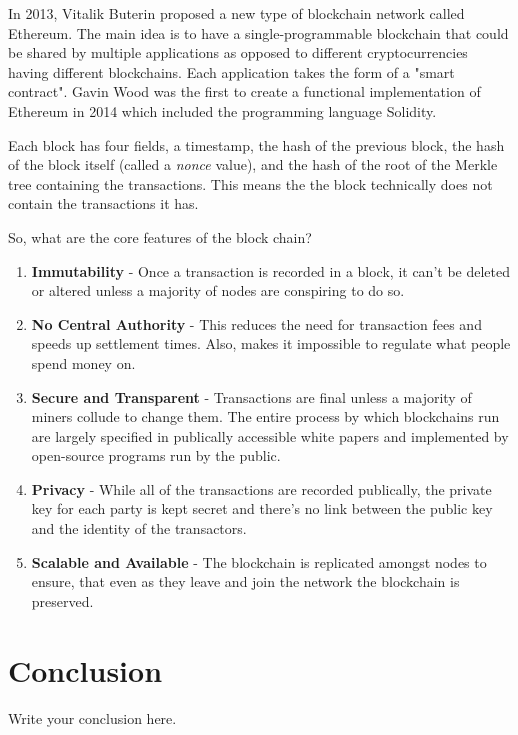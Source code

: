\documentclass{article}
\begin{document}
In 2013, Vitalik Buterin proposed a new type of blockchain network called Ethereum. The main idea is to have a single-programmable blockchain that could be shared by multiple applications as opposed to different cryptocurrencies having different blockchains. Each application takes the form of a "smart contract". Gavin Wood was the first to create a functional implementation of Ethereum in 2014 which included the programming language Solidity.

Each block has four fields, a timestamp, the hash of the previous block, the hash of the block itself (called a \textit{nonce} value), and the hash of the root of the Merkle tree containing the transactions. This means the the block technically does not contain the transactions it has.

So, what are the core features of the block chain?
\begin{enumerate}
\item \textbf{Immutability} - Once a transaction is recorded in a block, it can't be deleted or altered unless a majority of nodes are conspiring to do so.
\item \textbf{No Central Authority} - This reduces the need for transaction fees and speeds up settlement times. Also, makes it impossible to regulate what people spend money on.
\item \textbf{Secure and Transparent} - Transactions are final unless a majority of miners collude to change them. The entire process by which blockchains run are largely specified in publically accessible white papers and implemented by open-source programs run by the public.
\item \textbf{Privacy} - While all of the transactions are recorded publically, the private key for each party is kept secret and there's no link between the public key and the identity of the transactors.
\item \textbf{Scalable and Available} - The blockchain is replicated amongst nodes to ensure, that even as they leave and join the network the blockchain is preserved.
\end{enumerate}

\section{Conclusion}
Write your conclusion here.
\end{document}
